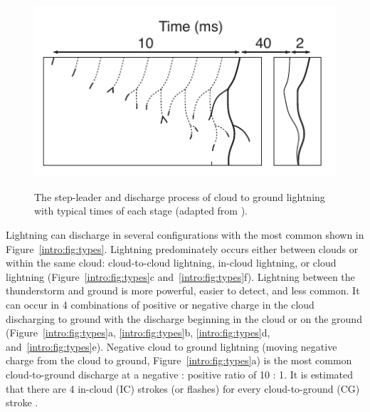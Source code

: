 \begin{figure}[ht!]
	\centering
	\includegraphics[scale=1]{Introduction/Figures/intro_evolution.pdf}\\
	\caption{The step-leader and discharge process of cloud to ground lightning with typical times of each stage (adapted from \citet{Ogawa1995}).}
	\label{intro:fig:evolution}
\end{figure}

Lightning can discharge in several configurations with the most common shown in Figure~\ref{intro:fig:types}.
Lightning predominately occurs either between clouds or within the same cloud: cloud-to-cloud lightning, in-cloud lightning, or cloud lightning (Figure~\ref{intro:fig:types}c and~\ref{intro:fig:types}f).
Lightning between the thunderstorm and ground is more powerful, easier to detect, and less common.
It can occur in 4 combinations of positive or negative charge in the cloud discharging to ground with the discharge beginning in the cloud or on the ground (Figure~\ref{intro:fig:types}a, \ref{intro:fig:types}b, \ref{intro:fig:types}d, and~\ref{intro:fig:types}e).
Negative cloud to ground lightning (moving negative charge from the cloud to ground, Figure~\ref{intro:fig:types}a) is the most common cloud-to-ground discharge at a negative : positive ratio of 10 : 1.
It is estimated that there are 4 in-cloud (IC) strokes (or flashes) for every cloud-to-ground (CG) stroke \citep{Uman1969}.

